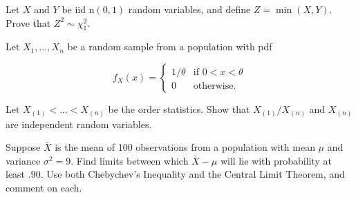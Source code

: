 \documentclass[12pt,letterpaper]{exam}
\begin{document}
\begin{questions}
	\begin{solution}
		
	\end{solution}
	
	\setcounter{question}{21}
	\question 
	Let \(X\) and \(Y\) be iid n\((0, 1)\) random variables, 
	and define \(Z = \min(X,Y)\). Prove that \(Z^2 \sim \chi^2_1 \).
	
	\begin{solution}
		
	\end{solution}

	\setcounter{question}{23}
	\question 
	Let \(X_1,\ldots, X_n\) be a random sample from a population with pdf
	
	\[
	f_X(x)=
	\begin{cases}
		1/\theta & \text{if } 0 < x < \theta \\
		0 	& \text{otherwise}.
	\end{cases}
	\]
	
	Let \(X_{(1)} < \ldots < X_{(n)}\) be the order statistics. 
	Show that \(X_{(1)}/X_{(n)}\) and \(X_{(n)}\) are independent random variables.
	
	\begin{solution}
		
	\end{solution}

	\setcounter{question}{30}
	\question
	Suppose \(\bar{X}\) is the mean of 100 observations from a population with mean \(\mu\) and variance \(\sigma^2 = 9\). 
	Find limits between which \(\bar{X}-\mu\) will lie with probability at least \(.90\). 
	Use both Chebychev’s Inequality and the Central Limit Theorem, and comment on each. 
	
	\begin{solution}
		
	\end{solution}
		

\end{questions}
\end{document}
